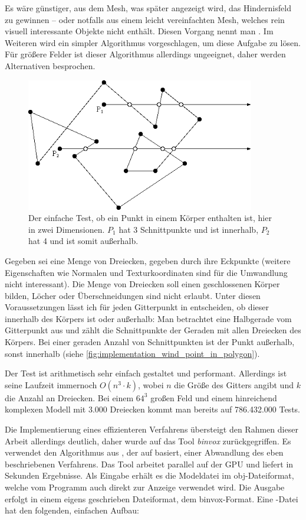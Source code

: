 Es wäre günstiger, aus dem Mesh, was später angezeigt wird, das
Hindernisfeld zu gewinnen -- oder notfalls aus einem leicht
vereinfachten Mesh, welches rein visuell interessante Objekte nicht
enthält. Diesen Vorgang nennt man . Im
Weiteren wird ein simpler Algorithmus vorgeschlagen, um diese Aufgabe
zu lösen. Für größere Felder ist dieser Algorithmus allerdings
ungeeignet, daher werden Alternativen besprochen.
\begin{figure}[h]
\centering
\includegraphics[width=10cm]{images/point_in_polygon}
\caption{Der einfache Test, ob ein Punkt in einem Körper enthalten ist, hier in zwei Dimensionen. $P_1$ hat 3 Schnittpunkte und ist innerhalb, $P_2$ hat 4 und ist somit außerhalb.}
\label{fig:implementation_wind_point_in_polygon}
\end{figure}
Gegeben sei eine Menge von Dreiecken, gegeben durch ihre Eckpunkte
(weitere Eigenschaften wie Normalen und Texturkoordinaten sind für die
Umwandlung nicht interessant). Die Menge von Dreiecken soll einen
geschlossenen Körper bilden, Löcher oder Überschneidungen sind nicht
erlaubt. Unter diesen Voraussetzungen lässt ich für jeden Gitterpunkt
in  entscheiden, ob dieser innerhalb des
Körpers ist oder außerhalb: Man betrachtet eine Halbgerade vom
Gitterpunkt aus und zählt die Schnittpunkte der Geraden mit allen
Dreiecken des Körpers. Bei einer geraden Anzahl von Schnittpunkten ist
der Punkt außerhalb, sonst innerhalb (siehe
\autoref{fig:implementation_wind_point_in_polygon}).

Der Test ist arithmetisch sehr einfach gestaltet und
performant. Allerdings ist seine Laufzeit immernoch $O(n^3 \cdot k)$,
wobei $n$ die Größe des Gitters angibt und $k$ die Anzahl an
Dreiecken. Bei einem $64^3$ großen Feld und einem hinreichend
komplexen Modell mit $3.000$ Dreiecken kommt man bereits auf
786.432.000 Tests.

Die Implementierung eines effizienteren Verfahrens übersteigt den
Rahmen dieser Arbeit allerdings deutlich, daher wurde auf das Tool
\emph{binvox} zurückgegriffen\cite{binvox2012}. Es verwendet den
Algorithmus aus \cite{Nooruddin2003}, der auf  basiert, einer Abwandlung des eben beschriebenen
Verfahrens. Das Tool arbeitet parallel auf der GPU und liefert in
Sekunden Ergebnisse. Als Eingabe erhält es die Modeldatei im
obj-Dateiformat, welche vom Programm auch direkt zur Anzeige verwendet
wird. Die Ausgabe erfolgt in einem eigens geschrieben Dateiformat, dem
binvox-Format\cite{binvoxfileformat2012}. Eine
-Datei hat den folgenden, einfachen Aufbau:

